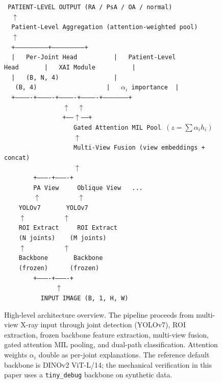 \documentclass{article}
\begin{document}
\begin{figure}[h]
\centering
\begin{minipage}{0.92\linewidth}
\small\tt
\noindent
PATIENT-LEVEL OUTPUT (RA / PsA / OA / normal)\\
~~$\uparrow$~~\\
~~Patient-Level Aggregation (attention-weighted pool)\\
~~$\uparrow$~~\\
~~+---------------------------+---------------------------+\\
~~|~~~Per-Joint Head~~~~~~~~~~|~~~Patient-Level Head~~~~~~~|~~~XAI Module~~~~~~~~~~|\\
~~|~~~(B,~N,~4)~~~~~~~~~~~~~~~|~~~(B,~4)~~~~~~~~~~~~~~~~~~~|~~~$\alpha_i$~importance~~|\\
~~+-------------+-------------+-------------+-------------+---------------------+\\
~~~~~~~~~~~~~~~~$\uparrow$~~$\uparrow$~~\\
~~~~~~~~~~~~~~~~+------$\uparrow$------+\\
~~~~~~~~~~~~~~~~~~~Gated Attention MIL Pool $(z = \sum \alpha_i h_i)$\\
~~~~~~~~~~~~~~~~~~~$\uparrow$\\
~~~~~~~~~~~~~~~~~~~Multi-View Fusion (view embeddings + concat)\\
~~~~~~~~~~~~~~~~~~~$\uparrow$\\
~~~~~~~~+----------+----------+\\
~~~~~~~~PA View~~~~~Oblique View~~~...\\
~~~~~~~~$\uparrow$~~~~~~~~~~$\uparrow$\\
~~~~YOLOv7~~~~~~~YOLOv7\\
~~~~$\uparrow$~~~~~~~~~~$\uparrow$\\
~~~~ROI Extract~~~~~ROI Extract\\
~~~~(N joints)~~~~(M joints)\\
~~~~$\uparrow$~~~~~~~~~~$\uparrow$\\
~~~~Backbone~~~~~~~Backbone\\
~~~~(frozen)~~~~~~(frozen)\\
~~~~~~~~+----------+----------+\\
~~~~~~~~~~~~~~$\uparrow$\\
~~~~~~~~~~INPUT IMAGE (B,~1,~H,~W)
\end{minipage}
\caption{High-level architecture overview. The pipeline proceeds from multi-view X-ray input through joint detection (YOLOv7), ROI extraction, frozen backbone feature extraction, multi-view fusion, gated attention MIL pooling, and dual-path classification. Attention weights $\alpha_i$ double as per-joint explanations. The reference default backbone is DINOv2 ViT-L/14; the mechanical verification in this paper uses a \texttt{tiny\_debug} backbone on synthetic data.}
\label{fig:arch}
\end{figure}
\end{document}
